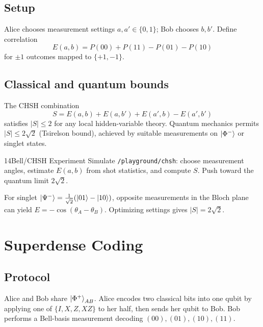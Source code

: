 \subsection{Setup}

Alice chooses measurement settings $a,a'\in\{0,1\}$; Bob chooses $b,b'$. Define correlation
\begin{equation}
E(a,b)=P(00)+P(11)-P(01)-P(10)
\label{eq:chsh-correlation}
\end{equation}
for $\pm1$ outcomes mapped to $\{+1,-1\}$.

\subsection{Classical and quantum bounds}

The CHSH combination
\begin{equation}
S=E(a,b)+E(a,b')+E(a',b)-E(a',b')
\label{eq:chsh-s}
\end{equation}
satisfies $|S|\le 2$ for any local hidden-variable theory. Quantum mechanics permits $|S|\le 2\sqrt{2}$ (Tsirelson bound), achieved by suitable measurements on $\ket{\Phi^-}$ or singlet states.

\begin{labbox}{14}{Bell/CHSH Experiment}
Simulate \texttt{/playground/chsh}: choose measurement angles, estimate $E(a,b)$ from shot statistics, and compute $S$. Push toward the quantum limit $2\sqrt{2}$.
\end{labbox}

\begin{example}
For singlet $\ket{\Psi^-}=\frac{1}{\sqrt{2}}(\ket{01}-\ket{10})$, opposite measurements in the Bloch plane can yield $E=-\cos(\theta_A-\theta_B)$. Optimizing settings gives $|S|=2\sqrt{2}$.
\end{example}

\section{Superdense Coding}
\label{sec:superdense}

\subsection{Protocol}

Alice and Bob share $\ket{\Phi^+}_{AB}$. Alice encodes two classical bits into one qubit by applying one of $\{I,X,Z,XZ\}$ to her half, then sends her qubit to Bob. Bob performs a Bell-basis measurement decoding $(00),(01),(10),(11)$.

